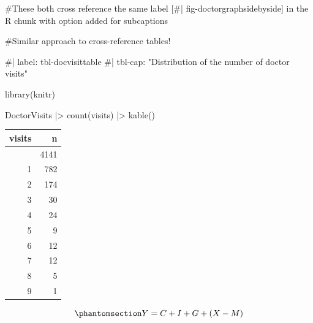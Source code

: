 \documentclass[
  letterpaper,
  DIV=11,
  numbers=noendperiod]{scrartcl}
\newenvironment{Shaded}{\begin{snugshade}}{\end{snugshade}}
\newcommand{\CommentTok}[1]{\textcolor[rgb]{0.37,0.37,0.37}{#1}}
\newcommand{\FunctionTok}[1]{\textcolor[rgb]{0.28,0.35,0.67}{#1}}
\newcommand{\NormalTok}[1]{\textcolor[rgb]{0.00,0.23,0.31}{#1}}
\newcommand{\SpecialCharTok}[1]{\textcolor[rgb]{0.37,0.37,0.37}{#1}}
\begin{document}
\begin{Shaded}
\begin{Highlighting}[]
\CommentTok{\#These both cross reference the same label [\#| fig{-}doctorgraphsidebyside] in the R chunk with option added for subcaptions}
\end{Highlighting}
\end{Shaded}

\begin{Shaded}
\begin{Highlighting}[]
\CommentTok{\#Similar approach to cross{-}reference tables!}

\CommentTok{\#| label: tbl{-}docvisittable}
\CommentTok{\#| tbl{-}cap: "Distribution of the number of doctor visits"}

\FunctionTok{library}\NormalTok{(knitr)}

\NormalTok{DoctorVisits }\SpecialCharTok{|\textgreater{}}
  \FunctionTok{count}\NormalTok{(visits) }\SpecialCharTok{|\textgreater{}}
  \FunctionTok{kable}\NormalTok{()}
\end{Highlighting}
\end{Shaded}

\begin{longtable}[]{@{}rr@{}}
\toprule\noalign{}
visits & n \\
\midrule\noalign{}
\endhead
\bottomrule\noalign{}
\endlastfoot
0 & 4141 \\
1 & 782 \\
2 & 174 \\
3 & 30 \\
4 & 24 \\
5 & 9 \\
6 & 12 \\
7 & 12 \\
8 & 5 \\
9 & 1 \\
\end{longtable}

\begin{equation}\phantomsection\label{eq-gdpidentity}{
Y = C + I + G + (X - M)
}\end{equation}
\end{document}
